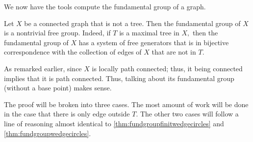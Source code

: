 \documentclass[12pt]{article}
\begin{document}
We now have the tools compute the fundamental group of a graph.

\begin{thm} \label{thm:fundgroupgraph}
	Let $X$ be a connected graph that is not a tree. Then the fundamental group of $X$ is a nontrivial free group. Indeed, if $T$ is a maximal tree in $X,$ then the fundamental group of $X$ has a system of free generators that is in bijective correspondence with the collection of edges of $X$ that are not in $T.$
\end{thm}
As remarked earlier, since $X$ is locally path connected; thus, it being connected implies that it is path connected. Thus, talking about its fundamental group (without a base point) makes sense.

The proof will be broken into three cases. The most amount of work will be done in the case that there is only edge outside $T.$ The other two cases will follow a line of reasoning almost identical to \cref{thm:fundgroupfinitwedgecircles} and \cref{thm:fundgroupwedgecircles}.
\end{document}
